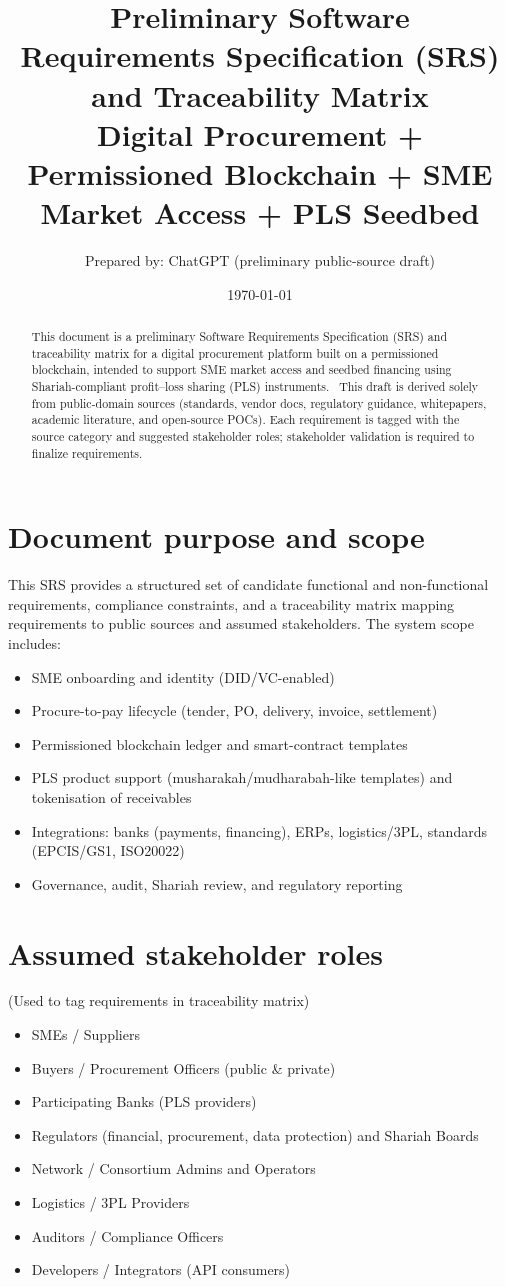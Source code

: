 \documentclass[11pt,a4paper]{article}
\title{Preliminary Software Requirements Specification (SRS) \\and Traceability Matrix\\\large Digital Procurement + Permissioned Blockchain + SME Market Access + PLS Seedbed}
\author{Prepared by: ChatGPT (preliminary public-source draft)}
\date{\today}
\begin{document}
\maketitle
\begin{abstract}
This document is a preliminary Software Requirements Specification (SRS) and traceability matrix for a digital procurement platform built on a permissioned blockchain, intended to support SME market access and seedbed financing using Shariah-compliant profit–loss sharing (PLS) instruments.\
\noindent
This draft is derived solely from public-domain sources (standards, vendor docs, regulatory guidance, whitepapers, academic literature, and open-source POCs). Each requirement is tagged with the source category and suggested stakeholder roles; stakeholder validation is required to finalize requirements.
\end{abstract}
\tableofcontents
\clearpage
\section{Document purpose and scope}
This SRS provides a structured set of candidate functional and non-functional requirements, compliance constraints, and a traceability matrix mapping requirements to public sources and assumed stakeholders. The system scope includes: \begin{itemize}[noitemsep]
\item SME onboarding and identity (DID/VC-enabled)
\item Procure-to-pay lifecycle (tender, PO, delivery, invoice, settlement)
\item Permissioned blockchain ledger and smart-contract templates
\item PLS product support (musharakah/mudharabah-like templates) and tokenisation of receivables
\item Integrations: banks (payments, financing), ERPs, logistics/3PL, standards (EPCIS/GS1, ISO20022)
\item Governance, audit, Shariah review, and regulatory reporting
\end{itemize}

\section{Assumed stakeholder roles}
(Used to tag requirements in traceability matrix)
\begin{itemize}
\item SMEs / Suppliers
\item Buyers / Procurement Officers (public \& private)
\item Participating Banks (PLS providers)
\item Regulators (financial, procurement, data protection) and Shariah Boards
\item Network / Consortium Admins and Operators
\item Logistics / 3PL Providers
\item Auditors / Compliance Officers
\item Developers / Integrators (API consumers)
\end{itemize}
\end{document}
